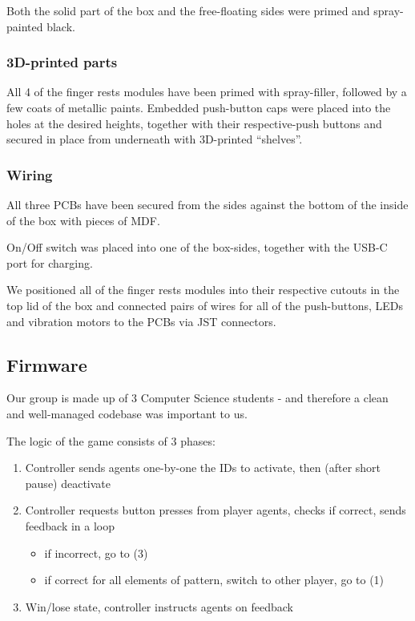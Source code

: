 \documentclass[acmsmall]{acmart}
\begin{document}
Both the solid part of the box and the free-floating sides were primed and spray-painted black.

\subsubsection{3D-printed parts}

All 4 of the finger rests modules have been primed with spray-filler, followed by a few coats of metallic paints.
Embedded push-button caps were placed into the holes at the desired heights, together with their respective-push buttons and secured in place from underneath with 3D-printed ``shelves''.


\subsubsection{Wiring}

All three PCBs have been secured from the sides against the bottom of the inside of the box with pieces of MDF.

On/Off switch was placed into one of the box-sides, together with the USB-C port for charging.

We positioned all of the finger rests modules into their respective cutouts in the top lid of the box and connected pairs of wires for all of the push-buttons, LEDs and vibration motors to the PCBs via JST connectors.


\subsection{Firmware}

Our group is made up of 3 Computer Science students - and therefore a clean and well-managed codebase was important to us.

The logic of the game consists of 3 phases:
\begin{enumerate}
  \item Controller sends agents one-by-one the IDs to activate, then (after short pause) deactivate
  \item Controller requests button presses from player agents, checks if correct, sends feedback in a loop
  \begin{itemize}
    \item if incorrect, go to (3)
    \item if correct for all elements of pattern, switch to other player, go to (1)
  \end{itemize}
  \item Win/lose state, controller instructs agents on feedback
\end{enumerate}
\end{document}
